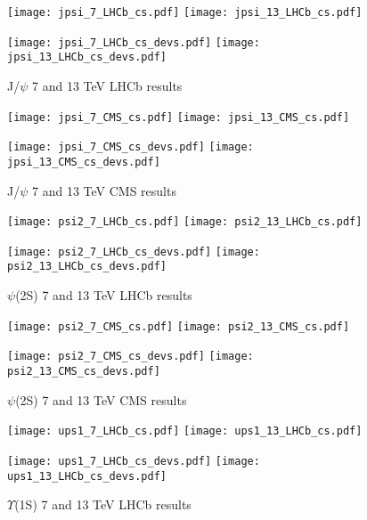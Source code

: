 \documentclass{article}
\begin{document}

\begin{figure}
\centering
\texttt{[image: jpsi\_7\_LHCb\_cs.pdf]}
\texttt{[image: jpsi\_13\_LHCb\_cs.pdf]}

\texttt{[image: jpsi\_7\_LHCb\_cs\_devs.pdf]}
\texttt{[image: jpsi\_13\_LHCb\_cs\_devs.pdf]}
\caption{J/$\psi$ 7 and 13 TeV LHCb results}
\end{figure}

\clearpage

\begin{figure}
\centering
\texttt{[image: jpsi\_7\_CMS\_cs.pdf]}
\texttt{[image: jpsi\_13\_CMS\_cs.pdf]}

\texttt{[image: jpsi\_7\_CMS\_cs\_devs.pdf]}
\texttt{[image: jpsi\_13\_CMS\_cs\_devs.pdf]}
\caption{J/$\psi$ 7 and 13 TeV CMS results}
\end{figure}

\clearpage

\begin{figure}
\centering
\texttt{[image: psi2\_7\_LHCb\_cs.pdf]}
\texttt{[image: psi2\_13\_LHCb\_cs.pdf]}

\texttt{[image: psi2\_7\_LHCb\_cs\_devs.pdf]}
\texttt{[image: psi2\_13\_LHCb\_cs\_devs.pdf]}
\caption{$\psi$(2S) 7 and 13 TeV LHCb results}
\end{figure}

\clearpage

\begin{figure}
\centering
\texttt{[image: psi2\_7\_CMS\_cs.pdf]}
\texttt{[image: psi2\_13\_CMS\_cs.pdf]}

\texttt{[image: psi2\_7\_CMS\_cs\_devs.pdf]}
\texttt{[image: psi2\_13\_CMS\_cs\_devs.pdf]}
\caption{$\psi$(2S) 7 and 13 TeV CMS results}
\end{figure}

\clearpage

\begin{figure}
\centering
\texttt{[image: ups1\_7\_LHCb\_cs.pdf]}
\texttt{[image: ups1\_13\_LHCb\_cs.pdf]}

\texttt{[image: ups1\_7\_LHCb\_cs\_devs.pdf]}
\texttt{[image: ups1\_13\_LHCb\_cs\_devs.pdf]}
\caption{$\Upsilon$(1S) 7 and 13 TeV LHCb results}
\end{figure}
\end{document}

